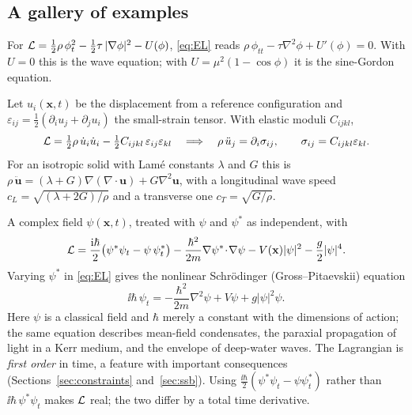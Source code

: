 \subsection{A gallery of examples}

\begin{example}
For $\mathcal{L}=\tfrac12\rho\,\phi_t^2-\tfrac12\tau\,|\nabla\phi|^2-U(\phi)$,
\eqref{eq:EL} reads $\rho\,\phi_{tt}-\tau\nabla^2\phi+U'(\phi)=0$. With $U=0$ this is
the wave equation; with $U=\mu^2(1-\cos\phi)$ it is the sine-Gordon equation.
\end{example}

\begin{example}
\label{ex:elastic}
Let $u_i(\mathbf{x},t)$ be the displacement from a reference configuration and
$\varepsilon_{ij}=\tfrac12(\partial_iu_j+\partial_ju_i)$ the small-strain
tensor. With elastic moduli $C_{ijkl}$,
\[
  \mathcal{L}=\tfrac12\rho\,\dot u_i\dot u_i-\tfrac12 C_{ijkl}\,\varepsilon_{ij}\varepsilon_{kl}
  \quad\Longrightarrow\quad
  \rho\,\ddot u_j=\partial_i\sigma_{ij},\qquad \sigma_{ij}=C_{ijkl}\varepsilon_{kl}.
\]
For an isotropic solid with Lam\'e constants $\lambda$ and $G$ this is
$\rho\,\ddot{\mathbf{u}}=(\lambda+G)\nabla(\nabla\!\cdot\!\mathbf{u})+G\nabla^2\mathbf{u}$, with a
longitudinal wave speed $c_L=\sqrt{(\lambda+2G)/\rho}$ and a transverse one
$c_T=\sqrt{G/\rho}$.
\end{example}

\begin{example}
\label{ex:schrodinger}
A complex field $\psi(\mathbf{x},t)$, treated with $\psi$ and $\psi^*$ as
independent, with
\begin{equation}
  \mathcal{L}=\frac{\mathrm{i}\hbar}{2}\big(\psi^*\psi_t-\psi\,\psi^*_t\big)
  -\frac{\hbar^2}{2m}\nabla\psi^*\!\cdot\!\nabla\psi-V(\mathbf{x})|\psi|^2-\frac g2|\psi|^4 .
  \label{eq:GP-L}
\end{equation}
Varying $\psi^*$ in \eqref{eq:EL} gives the nonlinear Schr\"odinger
(Gross--Pitaevskii) equation
\begin{equation}
  \ii\hbar\,\psi_t=-\frac{\hbar^2}{2m}\nabla^2\psi+V\psi+g|\psi|^2\psi .
  \label{eq:GP}
\end{equation}
Here $\psi$ is a classical field and $\hbar$ merely a constant with the
dimensions of action; the same equation describes mean-field condensates, the
paraxial propagation of light in a Kerr medium, and the envelope of deep-water
waves. The Lagrangian is \emph{first order} in time, a feature with important
consequences (Sections~\ref{sec:constraints} and~\ref{sec:ssb}). Using
$\tfrac{\ii\hbar}{2}(\psi^*\psi_t-\psi\psi^*_t)$ rather than $\ii\hbar\,\psi^*\psi_t$
makes $\mathcal{L}$ real; the two differ by a total time derivative.
\end{example}


